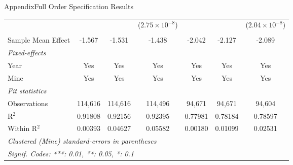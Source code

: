 \documentclass[aspectratio=169,11pt,dvipsnames, handout]{beamer}
\begin{document}
\begin{frame}{\textcolor{defaultclr!30}{Appendix}\hspace{0.75em}Full Order Specification Results}
\begin{adjustbox}{width=0.45\textwidth, center}
\begin{tabular}{lcccccc}
                                &                 &                         & ($2.75\times 10^{-8}$)         &                 &                               & ($2.04\times 10^{-8}$)\\    
                                &                 &                         &                                &                 &                               &  \\  
      Sample Mean Effect        & -1.567          & -1.531                  & -1.438                         & -2.042          & -2.127                        & -2.089\\  
      \midrule
      \emph{Fixed-effects}\\
      Year                      & Yes             & Yes                     & Yes                            & Yes             & Yes                           & Yes\\  
      Mine                      & Yes             & Yes                     & Yes                            & Yes             & Yes                           & Yes\\  
      \midrule
      \emph{Fit statistics}\\
      Observations              & 114,616         & 114,616                 & 114,496                        & 94,671          & 94,671                        & 94,604\\  
      R$^2$                     & 0.91808         & 0.92156                 & 0.92395                        & 0.77981         & 0.78184                       & 0.78597\\  
      Within R$^2$              & 0.00393         & 0.04627                 & 0.05582                        & 0.00180         & 0.01099                       & 0.02531\\  
      \midrule \midrule
      \multicolumn{7}{l}{\emph{Clustered (Mine) standard-errors in parentheses}}\\
      \multicolumn{7}{l}{\emph{Signif. Codes: ***: 0.01, **: 0.05, *: 0.1}}\\
   \end{tabular}
\end{adjustbox}

\hyperlink{frame:order}{} 
    
\end{frame}


\end{document}
